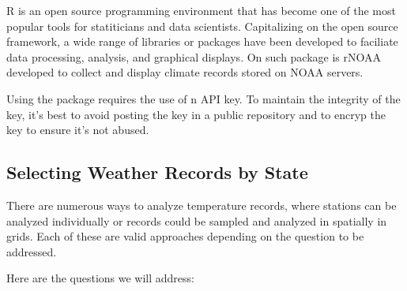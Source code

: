 \documentclass{article}
\begin{document}
R is an open source programming environment that has become one of the most popular tools for statiticians and data scientists. Capitalizing on the open source framework, a wide range of libraries or packages have been developed to faciliate data processing, analysis, and graphical displays. On such package is rNOAA developed to collect and display climate records stored on NOAA servers.

Using the package requires the use of n API key. To maintain the integrity of the key, it's best to avoid posting the key in a public repository and to encryp the key to ensure it's not abused. 

\subsection{Selecting Weather Records by State}

There are numerous ways to analyze temperature records, where stations can be analyzed individually or records could be sampled and analyzed in spatially in grids. Each of these are valid approaches depending on the question to be addressed. 

Here are the questions we will address: 
\end{document}
